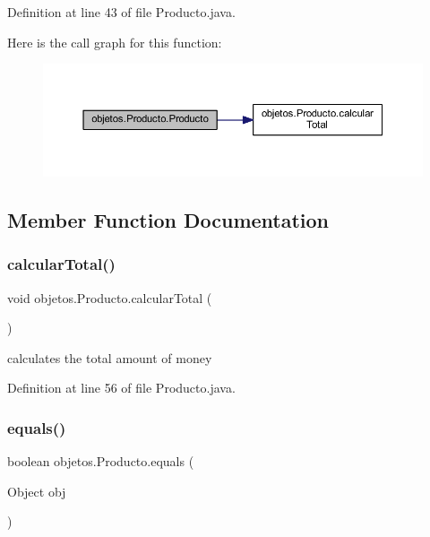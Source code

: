Definition at line 43 of file Producto.\+java.

Here is the call graph for this function\+:\nopagebreak
\begin{figure}[H]
\begin{center}
\leavevmode
\includegraphics[width=350pt]{classobjetos_1_1_producto_a2944862f9387c43686583f85fdb9f79f_cgraph}
\end{center}
\end{figure}


\subsection{Member Function Documentation}
\mbox{\label{classobjetos_1_1_producto_aca1868670a4e90738389af3bb5fa3e00}} 
\subsubsection{\texorpdfstring{calcular\+Total()}{calcularTotal()}}
{\footnotesize\ttfamily void objetos.\+Producto.\+calcular\+Total (\begin{DoxyParamCaption}{ }\end{DoxyParamCaption})}

calculates the total amount of money 

Definition at line 56 of file Producto.\+java.

\mbox{\label{classobjetos_1_1_producto_a69f1b30e6711e637dbfd074c057adeee}} 
\subsubsection{\texorpdfstring{equals()}{equals()}}
{\footnotesize\ttfamily boolean objetos.\+Producto.\+equals (\begin{DoxyParamCaption}\item[{Object}]{obj }\end{DoxyParamCaption})}



